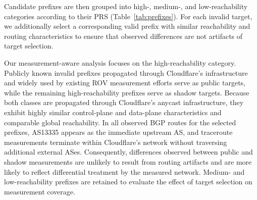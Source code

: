 \documentclass[sigconf, 10pt, anonymous, nonacm]{acmart}
\begin{document}
Candidate prefixes are then grouped into high-, medium-, and low-reachability categories according to their PRS (Table~\ref{tab:prefixes}). For each invalid target, we additionally select a corresponding valid prefix with similar reachability and routing characteristics to ensure that observed differences are not artifacts of target selection.

Our measurement-aware analysis focuses on the high-reachability category. Publicly known invalid prefixes propagated through Cloudflare's infrastructure and widely used by existing ROV measurement efforts serve as public targets, while the remaining high-reachability prefixes serve as shadow targets. Because both classes are propagated through Cloudflare's anycast infrastructure, they exhibit highly similar control-plane and data-plane characteristics and comparable global reachability. In all observed BGP routes for the selected prefixes, AS13335 appears as the immediate upstream AS, and traceroute measurements terminate within Cloudflare's network without traversing additional external ASes. Consequently, differences observed between public and shadow measurements are unlikely to result from routing artifacts and are more likely to reflect differential treatment by the measured network. Medium- and low-reachability prefixes are retained to evaluate the effect of target selection on measurement coverage.
\end{document}
